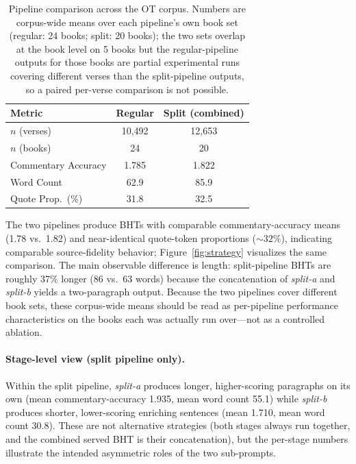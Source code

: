 \begin{table}[htbp]
\centering
\small
\caption{Pipeline comparison across the OT corpus. Numbers are corpus-wide means over each pipeline's own book set (regular: 24 books; split: 20 books); the two sets overlap at the book level on 5 books but the regular-pipeline outputs for those books are partial experimental runs covering different verses than the split-pipeline outputs, so a paired per-verse comparison is not possible.}
\label{tab:strategy}
\begin{tabular}{@{}lcc@{}}
\toprule
\textbf{Metric} & \textbf{Regular} & \textbf{Split (combined)} \\
\midrule
$n$ (verses) & 10{,}492 & 12{,}653 \\
$n$ (books) & 24 & 20 \\
Commentary Accuracy & 1.785 & 1.822 \\
Word Count & 62.9 & 85.9 \\
Quote Prop.\ (\%) & 31.8 & 32.5 \\
\bottomrule
\end{tabular}
\end{table}

\noindent The two pipelines produce BHTs with comparable commentary-accuracy means (1.78 vs.\ 1.82) and near-identical quote-token proportions (${\sim}32\%$), indicating comparable source-fidelity behavior; Figure~\ref{fig:strategy} visualizes the same comparison. The main observable difference is length: split-pipeline BHTs are roughly 37\% longer (86 vs.\ 63 words) because the concatenation of \emph{split-a} and \emph{split-b} yields a two-paragraph output. Because the two pipelines cover different book sets, these corpus-wide means should be read as per-pipeline performance characteristics on the books each was actually run over---not as a controlled ablation.

\paragraph{Stage-level view (split pipeline only).} Within the split pipeline, \emph{split-a} produces longer, higher-scoring paragraphs on its own (mean commentary-accuracy 1.935, mean word count 55.1) while \emph{split-b} produces shorter, lower-scoring enriching sentences (mean 1.710, mean word count 30.8). These are not alternative strategies (both stages always run together, and the combined served BHT is their concatenation), but the per-stage numbers illustrate the intended asymmetric roles of the two sub-prompts.

